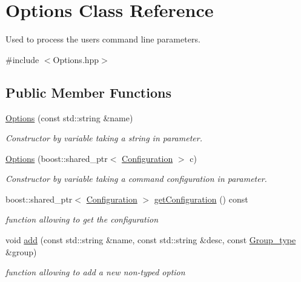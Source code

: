 \hypertarget{classOptions}{
\section{Options Class Reference}
\label{classOptions}
}


Used to process the users command line parameters.  




{\ttfamily \#include $<$Options.hpp$>$}

\subsection*{Public Member Functions}
\begin{DoxyCompactItemize}
\item 
\hyperlink{classOptions_a8274e100da90b671193dc80cdd2ad4c4}{Options} (const std::string \&name)
\begin{DoxyCompactList}\small\item\em Constructor by variable taking a string in parameter. \item\end{DoxyCompactList}\item 
\hyperlink{classOptions_ae1a28f4270459e280a1085489cd79c9e}{Options} (boost::shared\_\-ptr$<$ \hyperlink{classConfiguration}{Configuration} $>$ c)
\begin{DoxyCompactList}\small\item\em Constructor by variable taking a command configuration in parameter. \item\end{DoxyCompactList}\item 
boost::shared\_\-ptr$<$ \hyperlink{classConfiguration}{Configuration} $>$ \hyperlink{classOptions_a1d7abce1725894239a496a61d9db3c52}{getConfiguration} () const 
\begin{DoxyCompactList}\small\item\em function allowing to get the configuration \item\end{DoxyCompactList}\item 
void \hyperlink{classOptions_a1e3932da0674e048c6c03b4ddc07594a}{add} (const std::string \&name, const std::string \&desc, const \hyperlink{Options_8hpp_abca947614755a7e288afe5c44b07c98d}{Group\_\-type} \&group)
\begin{DoxyCompactList}\small\item\em function allowing to add a new non-\/typed option \item\end{DoxyCompactList}\item 

\end{DoxyCompactItemize}
